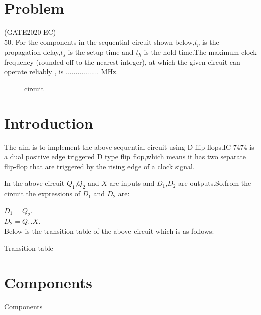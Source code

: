 \documentclass[10pt,a4paper]{article}
\title{\mytitle}
\author{LAKKIREDD VEERASIVA REDDY\\lakireddyveerasivareddy@gmail.com\\FWC22122 IITH-Future Wireless Communications     Assignment-ARM}
\date{}
\begin{document}
\maketitle
\tableofcontents
\pagebreak
\section{Problem}
(GATE2020-EC)\\
50. For the components in the sequential circuit shown below,$t_p$ is the propagation delay,$t_s$ is the setup time and $t_h$ is the hold time.The maximum clock frequency (rounded off to the nearest integer), at which the given circuit can operate reliably , is ................. MHz.\newline
\begin{figure}[h]
\centering

\caption{circuit}
\label{figure 1}
\end{figure}
\section{Introduction}

            The aim is to implement the above sequential circuit using D flip-flops.IC 7474 is a dual positive edge triggered D type flip flop,which means it has two separate flip-flop that are triggered by the rising edge of a clock signal.

		In the above circuit $Q_1$,$Q_2$ and $X$ are inputs and $D_1$,$D_2$ are outputs.So,from the circuit the expressions of $D_1$ and $D_2$ are:

		$D_1 = Q_2$.\\
		$D_2 = Q_1.X$.\\

Below is the transition table of the above circuit which is as follows:
\pagebreak

	\begin{table}[h]
		\begin{center}
			
			\caption{Transition table}
			\label{table:1}
		\end{center}
	\end{table}

\section{Components}
\begin{table}[h]
\centering

\caption{Components}
\label{table:components}
\end{table}
\end{document}
